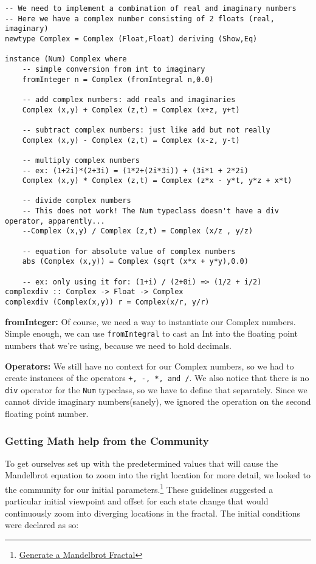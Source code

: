 \documentclass{article}
\begin{document}
    \begin{lstlisting}
-- We need to implement a combination of real and imaginary numbers
-- Here we have a complex number consisting of 2 floats (real, imaginary)
newtype Complex = Complex (Float,Float) deriving (Show,Eq)

instance (Num) Complex where
    -- simple conversion from int to imaginary
    fromInteger n = Complex (fromIntegral n,0.0)

    -- add complex numbers: add reals and imaginaries
    Complex (x,y) + Complex (z,t) = Complex (x+z, y+t)

    -- subtract complex numbers: just like add but not really
    Complex (x,y) - Complex (z,t) = Complex (x-z, y-t)

    -- multiply complex numbers
    -- ex: (1+2i)*(2+3i) = (1*2+(2i*3i)) + (3i*1 + 2*2i)
    Complex (x,y) * Complex (z,t) = Complex (z*x - y*t, y*z + x*t)

    -- divide complex numbers
    -- This does not work! The Num typeclass doesn't have a div operator, apparently...
    --Complex (x,y) / Complex (z,t) = Complex (x/z , y/z)

    -- equation for absolute value of complex numbers
    abs (Complex (x,y)) = Complex (sqrt (x*x + y*y),0.0)

    -- ex: only using it for: (1+i) / (2+0i) => (1/2 + i/2)
complexdiv :: Complex -> Float -> Complex
complexdiv (Complex(x,y)) r = Complex(x/r, y/r) 
    \end{lstlisting}
    
    \medskip\noindent
    \textbf{fromInteger:} Of course, we need a way to instantiate our Complex numbers. Simple enough, we can use \lstinline{fromIntegral} to cast an Int into the floating point numbers that we're using, because we need to hold decimals.
    
    \smallskip\noindent
    \textbf{Operators:} We still have no context for our Complex numbers, so we had to create instances of the operators \lstinline{+, -, *, and /}. We also notice that there is no \lstinline{div} operator for the \lstinline{Num} typeclass, so we have to define that separately. Since we cannot divide imaginary numbers(sanely), we ignored the operation on the second floating point number.
    
    \subsubsection{Getting Math help from the Community}
    To get ourselves set up with the predetermined values that will cause the Mandelbrot equation to zoom into the right location for more detail, we looked to the community for our initial parameters.\footnote{\href{https://codegolf.stackexchange.com/questions/3105/generate-a-mandelbrot-fractal}{Generate a Mandelbrot Fractal}} These guidelines suggested a particular initial viewpoint and offset for each state change that would continuously zoom into diverging locations in the fractal. The initial conditions were declared as so:
    
\end{document}
